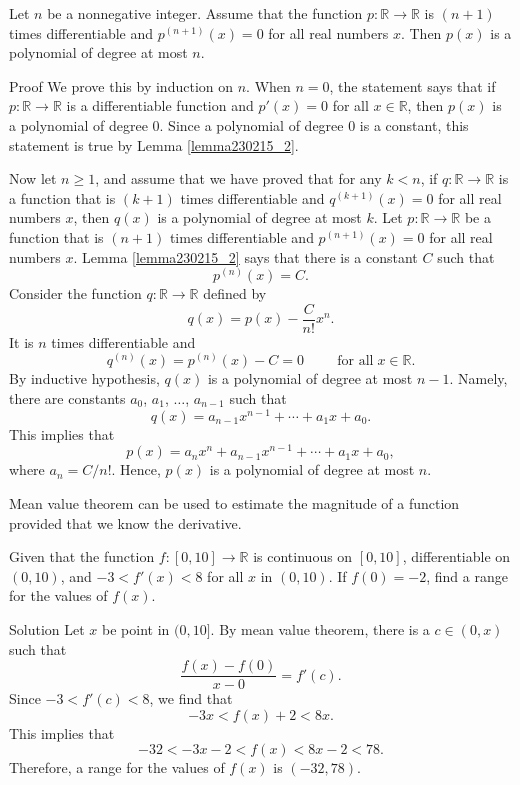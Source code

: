 \begin{example}{}
Let $n$ be a nonnegative integer. Assume that the function $p:\mathbb{R}\to\mathbb{R}$ is $(n+1)$ times differentiable and $p^{(n+1)}(x)=0$ for all real numbers $x$. Then $p(x)$ is a polynomial of degree at most $n$.
\end{example}
\begin{myproof}{Proof}
We prove this by induction on $n$. When $n=0$, the statement says that if $p:\mathbb{R}\to\mathbb{R}$ is a differentiable function and $p'(x)=0$ for all $x\in\mathbb{R}$, then $p(x)$ is a polynomial of degree  0. Since a polynomial of degree 0 is a constant, this statement is true by Lemma \ref{lemma230215_2}.

Now let $n\geq 1$, and assume that
 we have proved that for any $k<n$, if $q:\mathbb{R}\to\mathbb{R}$ is a function that is $(k+1)$ times differentiable and $q^{(k+1)}(x)=0$ for all real numbers $x$, then $q(x)$ is a polynomial of degree at most $k$. \bp Let $p:\mathbb{R}\to\mathbb{R}$ be a function that is $(n+1)$ times differentiable and $p^{(n+1)}(x)=0$ for all real numbers $x$. Lemma \ref{lemma230215_2} says that there is a constant $C$ such that
\[p^{(n)}(x)=C.\]
Consider the function $q:\mathbb{R}\to\mathbb{R}$ defined by
\[q(x)=p(x)-\frac{C}{n!}x^n.\]
It is $n$ times differentiable and
\[q^{(n)}(x)=p^{(n)}(x)-C=0\hspace{1cm}\text{for all}\;x\in\mathbb{R}.\]
By inductive hypothesis,
$q(x)$ is a polynomial of degree at most $n-1$. Namely, there are constants $a_0$, $a_1$, $\ldots$, $a_{n-1}$ such that
\[q(x)=a_{n-1}x^{n-1}+\cdots+a_1 x+a_0.\]
This implies that
\[p(x)=a_nx^n+a_{n-1}x^{n-1}+\cdots+a_1x+a_0,\]where $a_n=C/n!$. Hence, $p(x)$ is a polynomial of degree at most $n$.
\end{myproof}






Mean value theorem can be used to estimate the magnitude of a function provided that we know the derivative.
\begin{example}{}
Given that the function $f:[0,10]\to\mathbb{R}$ is continuous on $[0,10]$, differentiable on $(0,10)$, and $-3<f'(x)<8$ for all $x$ in $ (0,10)$. If $f(0)=-2$, find a range for the values of $f(x)$.
\end{example}
\begin{solution}{Solution}
Let $x$ be point in  $(0, 10]$. By mean value theorem, there is a $c\in (0, x)$ such that
\[\frac{f(x)-f(0)}{x-0}=f'(c).\]
Since $-3<f'(c)<8$, we find that
\[-3x<f(x)+2<8x.\]
This implies that
\[ -32<-3x-2<f(x)<8x-2<78.\]Therefore, a range for the values of $f(x)$ is $(-32, 78)$.
\end{solution}

